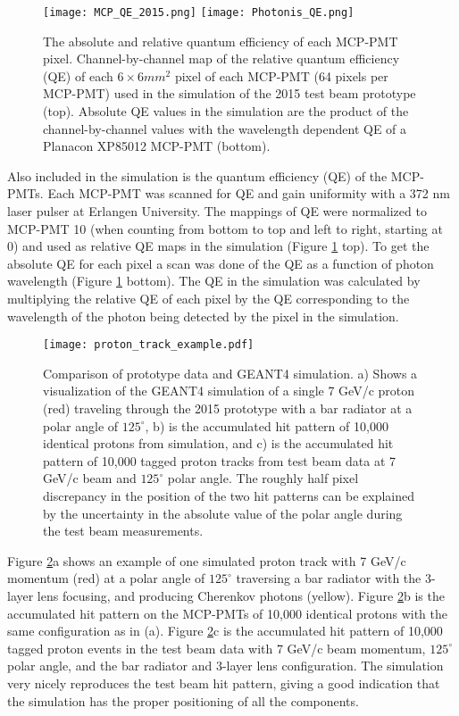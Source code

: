 \begin{figure}[!htb]
	\centering
	\texttt{[image: MCP\_QE\_2015.png]}
	\texttt{[image: Photonis\_QE.png]}
	\caption[The absolute and relative quantum efficiency of each MCP-PMT pixel.]{The absolute and relative quantum efficiency of each MCP-PMT pixel. Channel-by-channel map of the relative quantum efficiency (QE) of each $6\times6\unit{mm}^2$ pixel of each MCP-PMT (64 pixels per MCP-PMT) used in the simulation of the 2015 test beam prototype (top). Absolute QE values in the simulation are the product of the channel-by-channel values with the wavelength dependent QE of a Planacon XP85012 MCP-PMT (bottom).}
	\label{fig:quantum_efficiency}
\end{figure}

Also included in the simulation is the quantum efficiency (QE) of the MCP-PMTs. Each MCP-PMT was scanned for QE and gain uniformity with a 372 nm laser pulser at Erlangen University. The mappings of QE were normalized to MCP-PMT 10 (when counting from bottom to top and left to right, starting at 0) and used as relative QE maps in the simulation (Figure \ref{fig:quantum_efficiency} top). To get the absolute QE for each pixel a scan was done of the QE as a function of photon wavelength (Figure \ref{fig:quantum_efficiency} bottom). The QE in the simulation was calculated by multiplying the relative QE of each pixel by the QE corresponding to the wavelength of the photon being detected by the pixel in the simulation.

\begin{figure}[!htb]
	\centering
	\texttt{[image: proton\_track\_example.pdf]}
	\caption[Comparison of prototype data and GEANT4 simulation.]{Comparison of prototype data and GEANT4 simulation. a) Shows a visualization of the GEANT4 simulation of a single 7 GeV/c proton (red) traveling through the 2015 prototype with a bar radiator at a polar angle of $125^{\circ}$, b) is the accumulated hit pattern of 10,000 identical protons from simulation, and c) is the accumulated hit pattern of 10,000 tagged proton tracks from test beam data at 7 GeV/c beam and $125^{\circ}$ polar angle. The roughly half pixel discrepancy in the position of the two hit patterns can be explained by the uncertainty in the absolute value of the polar angle during the test beam measurements.}
	\label{fig:proton_track_example}
\end{figure}

Figure \ref{fig:proton_track_example}a shows an example of one simulated proton track with 7 GeV/c momentum (red) at a polar angle of $125^{\circ}$ traversing a bar radiator with the 3-layer lens focusing, and producing Cherenkov photons (yellow). Figure \ref{fig:proton_track_example}b is the accumulated hit pattern on the MCP-PMTs of 10,000 identical protons with the same configuration as in (a). Figure \ref{fig:proton_track_example}c is the accumulated hit pattern of 10,000 tagged proton events in the test beam data with 7 GeV/c beam momentum, $125^{\circ}$ polar angle, and the bar radiator and 3-layer lens configuration. The simulation very nicely reproduces the test beam hit pattern, giving a good indication that the simulation has the proper positioning of all the components.


